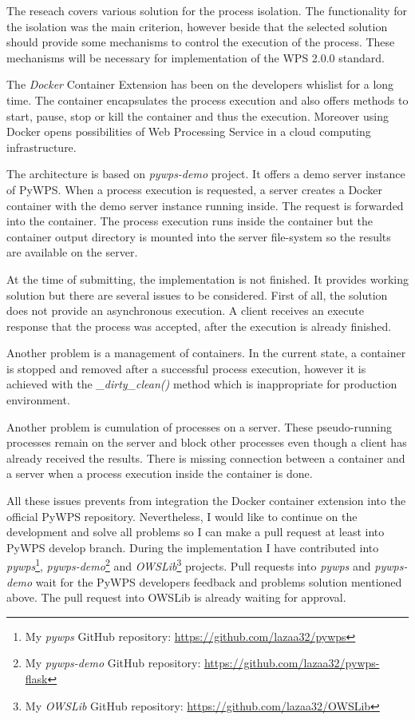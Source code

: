 \documentclass[12pt,a4paper]{article}
\begin{document}
The reseach covers various solution for the process isolation. The functionality for the isolation was the main
criterion, however beside that the selected solution should provide some mechanisms to control the execution of the
process. These mechanisms will be necessary for implementation of the WPS 2.0.0 standard.

The \textit{Docker} Container Extension has been on the developers whislist for a long time. The container encapsulates the
process execution and also offers methods to start, pause, stop or kill the container and thus the execution. Moreover
using Docker opens possibilities of Web Processing Service in a cloud computing infrastructure.

The architecture is based on \textit{pywps-demo} project. It offers a demo server instance of PyWPS. When a process
execution is requested, a server creates a Docker container with the demo server instance running inside. The request
is forwarded into the container. The process execution runs inside the container but the container output directory is 
mounted into the server file-system so the results are available on the server.

\newpage
At the time of submitting, the implementation is not finished. It provides working solution but there are
several issues to be considered. First of all, the solution does not provide an asynchronous execution. A client
receives an execute response that the process was accepted, after the execution is already finished.

Another problem is a management of containers. In the current state, a container is stopped and removed after
a successful process execution, however it is achieved with the \textit{\_dirty\_clean()} method which is
inappropriate for production environment.

Another problem is cumulation of processes on a server. These pseudo-running processes remain on the server
and block other processes even though a client has already received the results. There is missing connection
between a container and a server when a process execution inside the container is done.

All these issues prevents from integration the Docker container extension into the official PyWPS repository.
Nevertheless, I would like to continue on the development and solve all problems so I can make a pull request
at least into PyWPS develop branch. During the implementation I have contributed into 
\textit{pywps}\footnote{My \textit{pywps} GitHub repository: \url{https://github.com/lazaa32/pywps}}, 
\textit{pywps-demo}\footnote{My \textit{pywps-demo} GitHub repository: \url{https://github.com/lazaa32/pywps-flask}} and 
\textit{OWSLib}\footnote{My \textit{OWSLib} GitHub repository: \url{https://github.com/lazaa32/OWSLib}}
 projects. Pull requests into \textit{pywps} and \textit{pywps-demo} wait for the
PyWPS developers feedback and problems solution mentioned above. The pull request into OWSLib is already waiting
for approval. 
\end{document}
